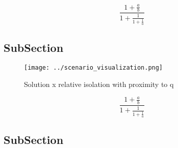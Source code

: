 \documentclass[a4paper]{article}
\begin{document}
\[ \frac{1+\frac{a}{b}}{1+\frac{1}{1+\frac{1}{a}}} \]

\subsection{SubSection}

\begin{figure}
\centering
\texttt{[image: ../scenario\_visualization.png]}
\caption{Solution x relative isolation with proximity to q
}
\end{figure}
 
\[ \frac{1+\frac{a}{b}}{1+\frac{1}{1+\frac{1}{a}}} \]

\subsection{SubSection}
\end{document}
